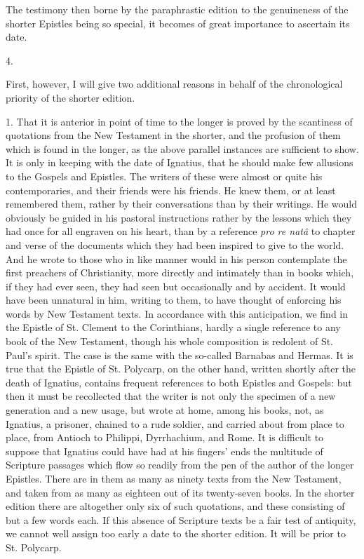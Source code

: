 The testimony then borne by
the paraphrastic edition to the genuineness of the shorter Epistles
being so special, it becomes of great importance to ascertain its
date.

4.

First, however, I will give
two additional reasons in behalf of the chronological priority of the
shorter edition.

1. That it is anterior in
point of time to the longer is proved by the scantiness of
quotations from the New Testament in the shorter, and the profusion of
them which is found in the longer, as the above parallel instances are
sufficient to show. It is only in keeping with the date of Ignatius,
that he should make few allusions to the Gospels and Epistles. The
writers of these were almost or quite his contemporaries, and their
friends were his friends. He knew them, or at least remembered them,
rather by their conversations than by their writings. He would
obviously be guided in his pastoral instructions rather by the lessons
which they had once for all engraven on his heart, than by a reference
\emph{pro re natâ} to chapter and verse of the documents which they
had been inspired to give to the world. And he wrote to those who in
like manner would in his person contemplate the first preachers of
Christianity, more directly and intimately than in books which, if
they had ever seen, they had seen but occasionally and by accident. It
would have been unnatural in him, writing to them, to have thought of
enforcing his words by New Testament texts. In accordance with this
anticipation, we find in the Epistle of St. Clement to the
Corinthians, hardly a single reference to any book of the New
Testament, though his whole composition is redolent of St. Paul's
spirit. The case is the same with the so-called Barnabas and Hermas.
It is true that the Epistle of St. Polycarp, on the other hand,
written shortly after the death of Ignatius, contains frequent
references to both Epistles and Gospels: but then it must be
recollected that the writer is not only the specimen of a new
generation and a new usage, but wrote at home, among his books,
not, as Ignatius, a prisoner, chained to a rude soldier, and carried
about from place to place, from Antioch to Philippi, Dyrrhachium, and
Rome. It is difficult to suppose that Ignatius could have had at his
fingers' ends the multitude of Scripture passages which flow so
readily from the pen of the author of the longer Epistles. There are
in them as many as ninety texts from the New Testament, and taken from
as many as eighteen out of its twenty-seven books. In the shorter
edition there are altogether only six of such quotations, and these
consisting of but a few words each. If this absence of Scripture texts
be a fair test of antiquity, we cannot well assign too early a date to
the shorter edition. It will be prior to St. Polycarp.

